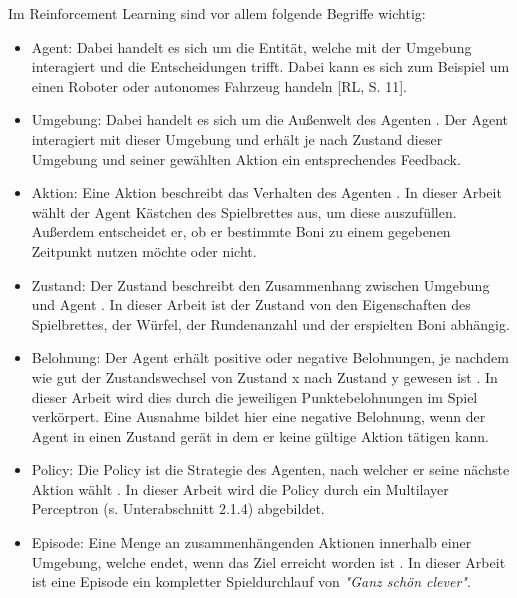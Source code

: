 Im Reinforcement Learning sind vor allem folgende Begriffe wichtig:

\begin{itemize}
\item Agent: Dabei handelt es sich um die Entität, welche mit der Umgebung interagiert und die Entscheidungen trifft. Dabei kann es sich zum Beispiel um einen Roboter oder autonomes Fahrzeug handeln [RL, S. 11].

\item Umgebung: Dabei handelt es sich um die Außenwelt des Agenten \cite[S. 11]{ris-ala_fundamentals_2023}. Der Agent interagiert mit dieser Umgebung und erhält je nach Zustand dieser Umgebung und seiner gewählten Aktion ein entsprechendes Feedback.

\item Aktion: Eine Aktion beschreibt das Verhalten des Agenten \cite[S. 11]{ris-ala_fundamentals_2023}. In dieser Arbeit wählt der Agent Kästchen des Spielbrettes aus, um diese auszufüllen. Außerdem entscheidet er, ob er bestimmte Boni zu einem gegebenen Zeitpunkt nutzen möchte oder nicht.

\item Zustand: Der Zustand beschreibt den Zusammenhang zwischen Umgebung und Agent \cite[S. 11]{ris-ala_fundamentals_2023}. In dieser Arbeit ist der Zustand von den Eigenschaften des Spielbrettes, der Würfel, der Rundenanzahl und der erspielten Boni abhängig.

\item Belohnung: Der Agent erhält positive oder negative Belohnungen, je nachdem wie gut der Zustandswechsel von Zustand x nach Zustand y gewesen ist \cite[S. 11]{ris-ala_fundamentals_2023}. In dieser Arbeit wird dies durch die jeweiligen Punktebelohnungen im Spiel verkörpert. Eine Ausnahme bildet hier eine negative Belohnung, wenn der Agent in einen Zustand gerät in dem er keine gültige Aktion tätigen kann.

\item Policy: Die Policy ist die Strategie des Agenten, nach welcher er seine nächste Aktion wählt \cite[S. 11]{ris-ala_fundamentals_2023}. In dieser Arbeit wird die Policy durch ein Multilayer Perceptron (s. Unterabschnitt 2.1.4) abgebildet.

\item Episode: Eine Menge an zusammenhängenden Aktionen innerhalb einer Umgebung, welche endet, wenn das Ziel erreicht worden ist \cite[S. 11]{ris-ala_fundamentals_2023}. In dieser Arbeit ist eine Episode ein kompletter Spieldurchlauf von \textit{"Ganz schön clever"}.
\end{itemize}

